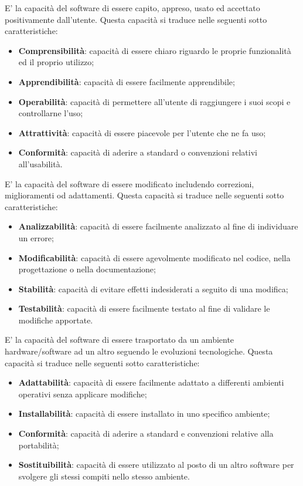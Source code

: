 	E' la capacità del software di essere capito, appreso, usato ed accettato positivamente dall'utente. Questa capacità si traduce nelle seguenti sotto caratteristiche:
	\begin{itemize}
		\item{\textbf{Comprensibilità}: capacità di essere chiaro riguardo le proprie funzionalità ed il proprio utilizzo;}
		\item{\textbf{Apprendibilità}: capacità di essere facilmente apprendibile;}
		\item{\textbf{Operabilità}: capacità di permettere all'utente di raggiungere i suoi scopi e controllarne l'uso;}
		\item{\textbf{Attrattività}: capacità di essere piacevole per l'utente che ne fa uso;}
		\item{\textbf{Conformità}: capacità di aderire a standard o convenzioni relativi all'usabilità.}
	\end{itemize}

	E' la capacità del software di essere modificato includendo correzioni, miglioramenti od adattamenti. Questa capacità si traduce nelle seguenti sotto caratteristiche:
	\begin{itemize}
		\item{\textbf{Analizzabilità}: capacità di essere facilmente analizzato al fine di individuare un errore;}
		\item{\textbf{Modificabilità}: capacità di essere agevolmente modificato nel codice, nella progettazione o nella documentazione;}
		\item{\textbf{Stabilità}: capacità di evitare effetti indesiderati a seguito di una modifica;}
		\item{\textbf{Testabilità}: capacità di essere facilmente testato al fine di validare le modifiche apportate.}
	\end{itemize}

	E' la capacità del software di essere trasportato da un ambiente hardware/software ad un altro seguendo le evoluzioni tecnologiche. Questa capacità si traduce nelle seguenti sotto caratteristiche:
	\begin{itemize}
		\item{\textbf{Adattabilità}: capacità di essere facilmente adattato a differenti ambienti operativi senza applicare modifiche;}
		\item{\textbf{Installabilità}: capacità di essere installato in uno specifico ambiente;}
		\item{\textbf{Conformità}: capacità di aderire a standard e convenzioni relative alla portabilità;}
		\item{\textbf{Sostituibilità}: capacità di essere utilizzato al posto di un altro software per svolgere gli stessi compiti nello stesso ambiente.}
	\end{itemize}
	
